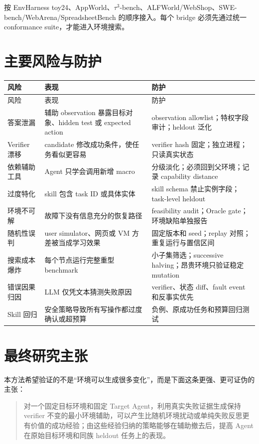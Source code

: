 \documentclass[11pt,a4paper,fontset=fandol]{ctexart}
\begin{document}
按 EnvHarness toy24、AppWorld、$\tau^3$-bench、ALFWorld/WebShop、SWE-bench/WebArena/SpreadsheetBench 的顺序接入。每个 bridge 必须先通过统一 conformance suite，才能进入环境搜索。

\section{主要风险与防护}

\begin{longtable}{L{3.6cm}L{5.1cm}L{5.5cm}}
\toprule
风险 & 表现 & 防护 \\
\midrule
\endfirsthead
\toprule
风险 & 表现 & 防护 \\
\midrule
\endhead
答案泄漏 & 辅助 observation 暴露目标对象、hidden test 或 expected action & observation allowlist；特权字段审计；heldout 泛化 \\
Verifier 漂移 & candidate 修改成功条件，使任务看似更容易 & verifier hash 固定；独立进程；只读真实状态 \\
依赖辅助工具 & Agent 只学会调用新增 macro & 分级淡化；必须回到父环境；记录 capability distance \\
过度特化 & skill 包含 task ID 或具体实体 & skill schema 禁止实例字段；task-level heldout \\
环境不可解 & 故障下没有信息充分的恢复路径 & feasibility audit；Oracle gate；环境缺陷单独报告 \\
随机性误判 & user simulator、网页或 VM 方差被当成学习效果 & 固定版本和 seed；replay 对照；重复运行与置信区间 \\
搜索成本爆炸 & 每个节点运行完整重型 benchmark & 小子集筛选；successive halving；昂贵环境只验证稳定 mutation \\
错误因果归因 & LLM 仅凭文本猜测失败原因 & verifier、状态 diff、fault event 和反事实优先 \\
Skill 回归 & 安全策略导致所有写操作都过度确认或超预算 & 负例、原成功任务和预算回归测试 \\
\bottomrule
\end{longtable}

\section{最终研究主张}

本方法希望验证的不是“环境可以生成很多变化”，而是下面这条更强、更可证伪的主张：

\begin{quote}
对一个固定目标环境和固定 Target Agent，利用真实失败证据生成保持 verifier 不变的最小环境辅助，可以产生比随机环境扰动或单纯失败反思更有价值的成功经验；由这些经验归纳的策略能够在辅助撤去后，提高 Agent 在原始目标环境和同族 heldout 任务上的表现。
\end{quote}
\end{document}

